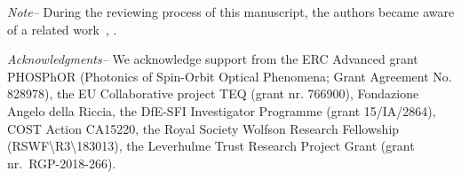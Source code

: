 \documentclass[
	aps, prl, superscriptaddress, twocolumn,
	10pt
	floatfix, 
    nofootinbib,
	tightenlines
]{revtex4-1}
\begin{document}
\textit{Note--} During the reviewing process of this manuscript, the authors became aware of a related work~\cite{Zhanwei_oamCNN}, . %

\begin{acknowledgments}
\textit{Acknowledgments--} We acknowledge support from the ERC Advanced grant PHOSPhOR (Photonics of Spin-Orbit Optical Phenomena; 
Grant Agreement No. 828978), the EU Collaborative project TEQ (grant nr. 766900), Fondazione Angelo della Riccia, the DfE-SFI Investigator Programme (grant 15/IA/2864), COST Action CA15220, the Royal Society Wolfson Research Fellowship (RSWF\textbackslash R3\textbackslash183013), the Leverhulme Trust Research Project Grant (grant nr.~RGP-2018-266).
\end{acknowledgments}

\end{document}
